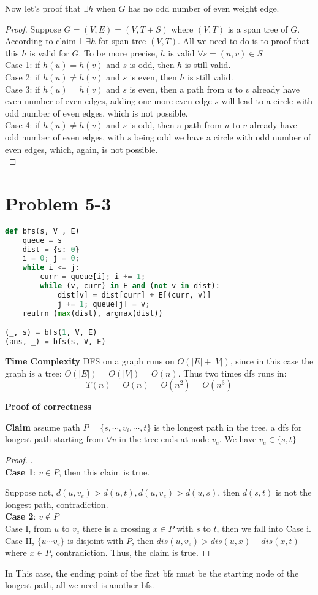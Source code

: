 \documentclass{article}
\begin{document}
Now let's proof that $\exists h$ when $G$ has no odd number of even weight edge.
\begin{proof}
	Suppose $G = (V, E) = (V, T + S)$ where $(V, T)$ is a span tree of $G$. According to claim 1 $\exists h$ for span tree $(V, T)$. All we need to do is to proof that this $h$ is valid for $G$. To be more precise, $h$ is valid $\forall s = (u, v) \in S$\\
	Case 1: if $h(u) = h(v)$ and $s$ is odd, then $h$ is still valid. \\
	Case 2: if $h(u) \neq h(v)$ and $s$ is even, then $h$ is still valid. \\
	Case 3: if $h(u) = h(v)$ and $s$ is even, then a path from $u$ to $v$ already have even number of even edges, adding one more even edge $s$ will lead to a circle with odd number of even edges, which is not possible. \\
	Case 4: if $h(u) \neq h(v)$ and $s$ is odd, then a path from $u$ to $v$ already have odd number of even edges, with $s$ being odd we have a circle with odd number of even edges, which, again, is not possible. \\

\end{proof}
\section*{Problem 5-3}
\begin{lstlisting}[language = python]
def bfs(s, V , E)
    queue = s
    dist = {s: 0}
    i = 0; j = 0;
    while i <= j:
        curr = queue[i]; i += 1;
        while (v, curr) in E and (not v in dist):
            dist[v] = dist[curr] + E[(curr, v)]
            j += 1; queue[j] = v;
    reutrn (max(dist), argmax(dist))

(_, s) = bfs(1, V, E)
(ans, _) = bfs(s, V, E)
\end{lstlisting}
\par \textbf{Time Complexity} DFS on a graph runs on $O(|E| + |V|)$, since in this case the graph is a tree: $O(|E|) = O(|V|) = O(n)$. Thus two times dfs runs in:
$$T(n) = O(n) = O(n^2) = O(n^3)$$
\par \textbf{Proof of correctness} 
\par \textbf{Claim} assume path $ P = \{s, \cdots, v_i, \cdots, t\}$ is the longest path in the tree, a dfs for longest path starting from $\forall v$ in the tree ends at node $v_e$. We have $v_e \in \{s, t\}$
\begin{proof}. \\
    \textbf{Case 1}: $v \in P$, then this claim is true. 
    \par Suppose not, $d(u, v_e) > d(u, t), d(u, v_e) > d(u, s)$, then $d(s, t)$ is not the longest path, contradiction. \\
    \textbf{Case 2}: $v \notin P$ \\
    	Case I, from $u$ to $v_e$ there is a crossing $x \in P$ with $s$ to $t$, then we fall into Case i.
    	Case II, $\{u \cdots v_e \}$ is disjoint with $P$, then $dis(u, v_e) > dis(u, x) + dis(x, t)$ where $x \in P$, contradiction.
    Thus, the claim is true.
\end{proof}
In This case, the ending point of the first bfs must be the starting node of the longest path, all we need is another bfs.
\end{document}

